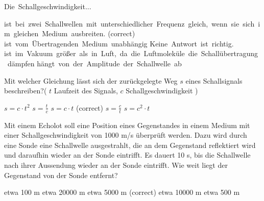 \documentclass[11pt]{exam}
\begin{document}
\setlength{\voffset}{-0.5in}
\setlength{\headsep}{5pt}

\hspace{2mm}
 \hspace{5mm}
\vspace{4mm}

\begin{questions}

\question Die Schallgeschwindigkeit...

\begin{choices}
	\choice ist bei zwei Schallwellen mit unterschiedlicher Frequenz gleich, wenn sie sich im gleichen Medium ausbreiten. (correct)
	\choice ist vom Übertragenden Medium unabhängig
	\choice Keine Antwort ist richtig.
	\choice ist im Vakuum größer als in Luft, da die Luftmoleküle die Schallübertragung dämpfen
	\choice hängt von der Amplitude der Schallwelle ab
\end{choices}

\vspace{3mm}\question Mit welcher Gleichung lässt sich der zurückgelegte Weg \( s \) eines Schallsignals beschreiben?( \( t \) Laufzeit des Signals, \( c \) Schallgeschwindigkeit )

\begin{choices}
	\choice \( s = c \cdot t^2 \)
	\choice \( s= \frac{t}{c} \)
	\choice \( s=c \cdot t \) (correct)
	\choice \( s= \frac{c}{t} \)
	\choice \( s=c^2 \cdot t \)
\end{choices}

\vspace{3mm}\question Mit einem Echolot soll eine Position eines Gegenstandes in einem Medium mit einer Schallgeschwindigkeit von 1000 m/s überprüft werden. Dazu wird durch eine Sonde eine Schallwelle ausgestrahlt, die an dem Gegenstand reflektiert wird und daraufhin wieder an der Sonde eintrifft. Es dauert 10 s, bis die Schallwelle nach ihrer Aussendung wieder an der Sonde eintrifft. Wie weit liegt der Gegenstand von der Sonde entfernt?

\begin{choices}
	\choice etwa 100 m
	\choice etwa 20000 m
	\choice etwa 5000 m (correct)
	\choice etwa 10000 m
	\choice etwa 500 m
\end{choices}


\end{questions}
\end{document}
